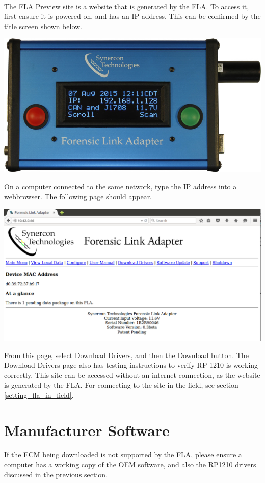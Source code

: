 \documentclass[11pt, oneside]{book}
\begin{document}
\paragraph{  }
The FLA Preview site is a website that is generated by the FLA. To access it, first ensure it is powered on, and has an IP address. This can be confirmed by the title screen shown below.
\begin{center}
\includegraphics[width=0.5\linewidth]{../media/fla_screens/ethernet_and_others/main/title_both}\label{fig:fla_title_screen}
\end{center}
On a computer connected to the same network, type the IP address into a webbrowser. The following page should appear.
\begin{center}
\includegraphics[width=1\linewidth]{../media/fla_preview_screenshots/main_page}\label{fig:preview_main_page}
\end{center}
From this page, select Download Drivers, and then the Download button. The Download Drivers page also has testing instructions to verify RP 1210 is working correctly. This site can be accessed without an internet connection, as the website is generated by the FLA. For connecting to the site in the field, see section \ref{setting_fla_in_field}.
\section{Manufacturer Software}
If the ECM being downloaded is not supported by the FLA, please ensure a computer has a working copy of the OEM software, and also the RP1210 drivers discussed in the previous section.
\end{document}

